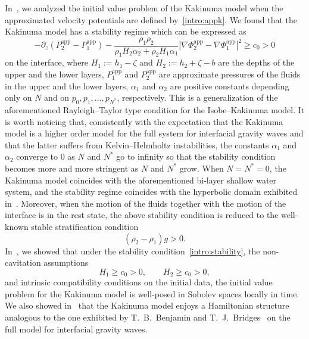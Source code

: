 \documentclass[11pt,leqno]{article}
\numberwithin{equation}{section}
\numberwithin{figure}{section}
\begin{document}
In~\cite{DucheneIguchi2020}, we analyzed the initial value problem of the Kakinuma model 
when the approximated velocity potentials are defined by~\eqref{intro:appk}. 
We found that the Kakinuma model has a 
stability regime which can be expressed as 
%
\begin{equation}\label{intro:stability}
	- \partial_z (P_2^\mathrm{app} - P_1^\mathrm{app} )
	- \frac{\rho_1\rho_2}{\rho_1H_2\alpha_2 + \rho_2H_1\alpha_1} 
	|\nabla\Phi_2^\mathrm{app} - \nabla\Phi_1^\mathrm{app}|^2  \geq c_0 > 0
\end{equation}
%
on the interface, where 
$H_1:= h_1 - \zeta$ and $H_2:=h_2 + \zeta - b$ are the depths of the upper and the lower layers,
$P_1^\mathrm{app}$ and $P_2^\mathrm{app}$ are approximate pressures of the fluids in the 
upper and the lower layers, $\alpha_1$ and $\alpha_2$ are positive constants depending only on $N$ and 
on $p_0,p_1,\ldots,p_{N^*}$, respectively. 
This is a generalization of the aforementioned Rayleigh--Taylor type condition for the Isobe--Kakinuma model. 
It is worth noticing that, consistently with the expectation that the Kakinuma model is a higher order model
for the full system for interfacial gravity waves and that the latter suffers from Kelvin--Helmholtz instabilities,
 the constants $\alpha_1$ and $\alpha_2$ converge to $0$ as $N$ and $N^*$ go to infinity 
so that the stability condition becomes more and more stringent as $N$ and $N^*$ grow. 
When $N=N^*=0$, the Kakinuma model coincides with the aforementioned bi-layer shallow water system, and the 
stability regime coincides with the hyperbolic domain exhibited in~\cite{BreschRenardy11}. 
Moreover, when the motion of the fluids together with the motion of the interface is in the rest state, 
the above stability condition is reduced to the well-known stable stratification condition 
%
\begin{equation}\label{Rayleigh's SC}
	(\rho_2-\rho_1)g>0. 
\end{equation}
%
In~\cite{DucheneIguchi2020}, we showed that under the stability condition~\eqref{intro:stability}, 
the non-cavitation assumptions
%
\begin{equation}\label{intro:non-cavitation}
	H_1\geq c_0>0, \qquad H_2\geq c_0>0,
\end{equation}
%
and intrinsic compatibility conditions on the initial data, 
the initial value problem for the Kakinuma model is well-posed in Sobolev spaces locally in time. 
We also showed in~\cite{DucheneIguchi2020} that the Kakinuma model enjoys a Hamiltonian structure analogous to 
the one exhibited by T.~B.~Benjamin and T.~J.~Bridges~\cite{BenjaminBridges1997} on the full model for 
interfacial gravity waves. 
\end{document}
